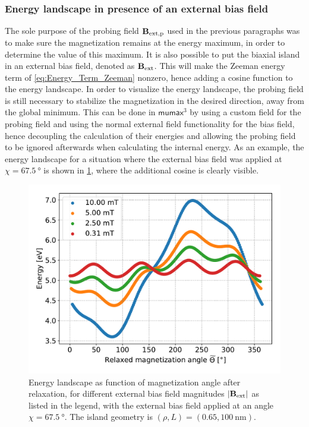 \documentclass[11pt,a4paper,english]{article}
\newcommand{\mumax}{$\mathsf{mumax}^3$}
\begin{document}
\subsubsection{Energy landscape in presence of an external bias field}
The sole purpose of the probing field $\vb{B_\mathrm{ext,p}}$ used in the previous paragraphs was to make sure the magnetization remains at the energy maximum, in order to determine the value of this maximum. It is also possible to put the biaxial island in an external bias field, denoted as $\vb{B_\mathrm{ext}}$. This will make the Zeeman energy term of \cref{eq:Energy_Term_Zeeman} nonzero, hence adding a cosine function to the energy landscape. In order to visualize the energy landscape, the probing field is still necessary to stabilize the magnetization in the desired direction, away from the global minimum. This can be done in \mumax{} by using a custom field for the probing field and using the normal external field functionality for the bias field, hence decoupling the calculation of their energies and allowing the probing field to be ignored afterwards when calculating the internal energy. As an example, the energy landscape for a situation where the external bias field was applied at $\chi=\SI{67.5}{\degree}$ is shown in \cref{fig:barrierLandscape_extField}, where the additional cosine is clearly visible.
\begin{figure}[b!]
    \centering
    \includegraphics[width=0.9\columnwidth]{Figures/biaxial_island/BarrierLandscape/Ext_K0.1Ms2_Bext1e-2-1e-4_a3Pi8.pdf}
    \caption{Energy landscape as function of magnetization angle after relaxation, for different external bias field magnitudes $\abs{\vb{B_\mathrm{ext}}}$ as listed in the legend, with the external bias field applied at an angle $\chi=\SI{67.5}{\degree}$. The island geometry is $(\rho,L)=(0.65,\SI{100}{\nano\metre})$.}
    \label{fig:barrierLandscape_extField}
\end{figure}
\end{document}
